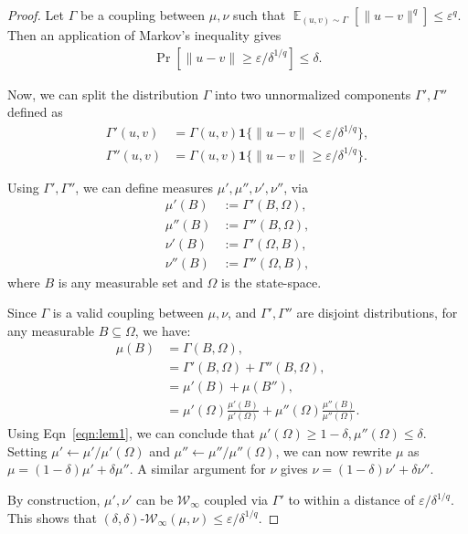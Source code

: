 \documentclass{article}
\newcommand{\norm}[1]{\|#1\|}
\newcommand{\eps}{\varepsilon}
\DeclareMathOperator*{\E}{\mathbb{E}}
\newcommand{\cW}{\mathcal W}
\begin{document}
\begin{proof}
Let $\Gamma$ be a coupling between $\mu, \nu$ such that $\E_{(u,v) \sim \Gamma} \left[ \norm{u - v}^q \right] \leq \eps^q$. Then an application of Markov's inequality gives
\begin{align}\label{eqn:lem1}
    \Pr[ \norm{u - v} \geq \eps / \delta^{1/q}] \leq \delta.
\end{align}

Now, we can split the distribution $\Gamma$ into two unnormalized components $\Gamma',\Gamma''$  defined as 
\begin{align*}
    \Gamma'(u,v) &= \Gamma(u,v) \bm{1}\{ \norm{u - v}< \eps / \delta^{1/q} \} ,\\
    \Gamma''(u,v) &= \Gamma(u,v) \bm{1}\{ \norm{u - v} \geq \eps / \delta^{1/q} \}.
\end{align*}

Using $\Gamma', \Gamma''$, we can define measures $\mu', \mu'', \nu', \nu''$, via
\begin{align*}
    \mu'(B) & := \Gamma'( B, \Omega),\\
    \mu''(B) & := \Gamma''( B, \Omega),\\
    \nu'(B) & := \Gamma'( \Omega, B),\\
    \nu''(B) & := \Gamma''( \Omega, B),
\end{align*}
where $B$ is any measurable set and $\Omega$ is the state-space.

Since $\Gamma$ is a valid coupling between $\mu, \nu$, and $\Gamma', \Gamma''$ are disjoint distributions, for any measurable $B\subseteq \Omega$, we have:
\begin{align*}
    \mu(B) &= \Gamma(B, \Omega) , \\
    &= \Gamma'(B, \Omega) + \Gamma''(B,\Omega),\\
    &= \mu'(B) + \mu(B''),\\
    &= \mu'(\Omega) \frac{\mu'(B)}{\mu'(\Omega)} + \mu''(\Omega) \frac{\mu''(B)}{\mu''(\Omega)}.
\end{align*}
Using Eqn~\eqref{eqn:lem1}, we can conclude that $\mu'(\Omega) \geq 1 - \delta, \mu''(\Omega) \leq \delta$.
Setting $\mu' \leftarrow \mu' / \mu'(\Omega)$ and $\mu'' \leftarrow \mu'' / \mu''(\Omega) $, we can now rewrite $\mu$ as $\mu = (1-\delta) \mu' + \delta \mu''$. A similar argument for $\nu$ gives $\nu = (1-\delta) \nu' + \delta \nu''$.

By construction, $\mu', \nu'$ can be $\cW_\infty$ coupled via $\Gamma'$ to within a distance of $\eps/ \delta^{1/q}$.
This shows that $(\delta, \delta)\text{-}\cW_\infty(\mu, \nu) \leq \eps / \delta^{1/q}$.



\end{proof}
\end{document}

